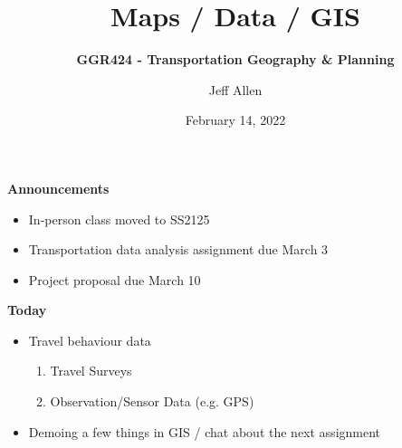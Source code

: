 \documentclass[aspectratio=169]{beamer}
\title{\textbf{Maps / Data / GIS}}
\subtitle{\textbf{GGR424 - Transportation Geography \& Planning}}
\author{Jeff Allen}
\institute{University of Toronto}
\date{February 14, 2022}
\begin{document}
	
\begin{frame}
	\titlepage	
\end{frame}




\begin{frame}
	
	\textbf{Announcements}
	
	\begin{itemize}
		\item In-person class moved to SS2125
		\item Transportation data analysis assignment due March 3
		\item Project proposal due March 10
	\end{itemize}
	
\end{frame}




\begin{frame}
	
	\textbf{Today}
	
	
	\begin{itemize}
		
		\item Travel behaviour data
		\begin{enumerate}
			\item Travel Surveys
			\item Observation/Sensor Data (e.g. GPS)
		\end{enumerate}
		\item Demoing a few things in GIS / chat about the next assignment
		
	\end{itemize}
	
	
\end{frame}
\end{document}
